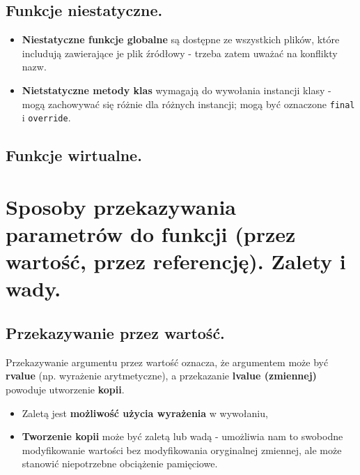 \documentclass[main.tex]{subfiles}
\begin{document}
    \subsection{Funkcje niestatyczne.}
    \begin{itemize}
        \item \textbf{Niestatyczne funkcje globalne} są dostępne ze wszystkich plików, które includują zawierające
        je plik źródłowy - trzeba zatem uważać na konflikty nazw.
        \item \textbf{Nietstatyczne metody klas} wymagają do wywołania instancji klasy - mogą zachowywać się różnie
        dla różnych instancji; mogą być oznaczone \texttt{final} i \texttt{override}.
    \end{itemize}

    \subsection{Funkcje wirtualne.}


    \section{Sposoby przekazywania parametrów do funkcji (przez wartość, przez referencję). Zalety i wady.}

    \subsection{Przekazywanie przez wartość.}

    Przekazywanie argumentu przez wartość oznacza, że argumentem może być \textbf{rvalue} (np. wyrażenie arytmetyczne), a przekazanie
    \textbf{lvalue (zmiennej)} powoduje utworzenie \textbf{kopii}.
    \begin{itemize}
        \item Zaletą jest \textbf{możliwość użycia wyrażenia} w wywołaniu,
        \item \textbf{Tworzenie kopii} może być zaletą lub wadą - umożliwia nam to swobodne modyfikowanie wartości
        bez modyfikowania oryginalnej zmiennej, ale może stanowić niepotrzebne obciążenie pamięciowe.
    \end{itemize}
\end{document}
